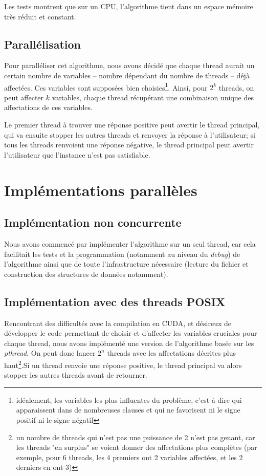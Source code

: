 \documentclass{article}
\newcommand{\cuda}{\textsc{CUDA}}
\begin{document}
Les tests montrent que sur un \textsc{CPU}, l'algorithme tient dans un espace mémoire très réduit et constant.


\subsection{Parallélisation}
    Pour paralléliser cet algorithme, nous avons décidé que chaque thread aurait un certain nombre de variables -- nombre dépendant du nombre de threads -- déjà affectées. Ces variables sont supposées bien choisies\footnote{idéalement, les variables les plus \og influentes \fg du problème, c'est-à-dire qui apparaissent dans de nombreuses clauses et qui ne favorisent ni le signe positif ni le signe négatif}. Ainsi, pour $2^{k}$ threads, on peut affecter $k$ variables, chaque thread récupérant une combinaison unique des affectations de ces variables.

    Le premier thread à trouver une réponse positive peut avertir le thread principal, qui va ensuite stopper les autres threads et renvoyer la réponse à l'utilisateur; si tous les threads renvoient une réponse négative, le thread principal peut avertir l'utilisateur que l'instance n'est pas satisfiable.


\section{Implémentations parallèles}
\subsection{Implémentation non concurrente}
    Nous avons commencé par implémenter l'algorithme sur un seul thread, car cela facilitait les tests et la programmation (notamment au niveau du \emph{debug}) de l'algorithme ainsi que de toute l'infrastructure nécessaire (lecture du fichier et construction des structures de données notamment). 

\subsection{Implémentation avec des threads \textsc{POSIX}}
    Rencontrant des difficultés avec la compilation en \cuda, et désireux de développer le code permettant de choisir et d'affecter les variables \og cruciales \fg pour chaque thread, nous avons implémenté une version de l'algorithme basée sur les \emph{pthread}. On peut donc lancer $2^{n}$ threads avec les affectations décrites plus haut\footnote{un nombre de threads qui n'est pas une puissance de 2 n'est pas genant, car les threads "en surplus" se voient donner des affectations plus complètes (par exemple, pour 6 threads, les 4 premiers ont 2 variables affectées, et les 2 derniers en ont 3)}.Si un thread renvoie une réponse positive, le thread principal va alors stopper les autres threads avant de retourner.
\end{document}
